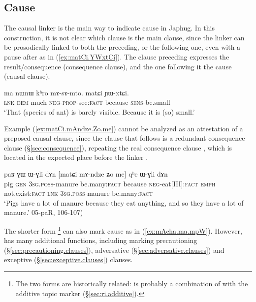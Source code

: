  \subsection{Cause} \label{sec:causal.clauses}
The causal linker  is the main way to indicate cause in Japhug. In this construction, it is not clear which clause is the main clause, since the linker can be prosodically linked to both the preceding, or the following one, even with a pause after  as in (\ref{ex:matCi.YWxtCi}). The clause preceding  expresses the result/consequence (consequence clause), and the one following it the cause (causal clause).


\begin{exe}
\ex \label{ex:matCi.YWxtCi}
\gll ma nɯnɯ kʰro mɤ-sɤ-mto. matɕi ɲɯ-xtɕi. \\
\textsc{lnk} \textsc{dem} much \textsc{neg}-\textsc{prop}-see:\textsc{fact} because \textsc{sens}-be.small \\
\glt `That (species of ant) is barely visible. Because it is (so) small.'
\end{exe} 

Example (\ref{ex:matCi.mAndze.Zo.me}) cannot be analyzed as an attestation of a preposed  causal clause, since the clause that follows  is a redundant consequence clause (§\ref{sec:consequence}), repeating the real consequence clause , which is located in the expected place before the linker .


\begin{exe}
\ex \label{ex:matCi.mAndze.Zo.me}
\gll paʁ ɣɯ ɯ-ɣli dɤn [matɕi mɤ-ndze ʑo me] qʰe ɯ-ɣli dɤn  \\
pig \textsc{gen} \textsc{3sg}.\textsc{poss}-manure be.many:\textsc{fact} because \textsc{neg}-eat[III]:\textsc{fact} \textsc{emph} not.exist:\textsc{fact} \textsc{lnk} \textsc{3sg}.\textsc{poss}-manure  be.many:\textsc{fact} \\
\glt `Pigs have a lot of manure because they eat anything, and so they have a lot of manure.' 05-paR, 106-107)
\end{exe}

The shorter form \footnote{The two forms are historically related:  is probably a combination of  with the additive topic marker  (§\ref{sec:ri.additive}). } can also mark cause as in (\ref{ex:mAcha.ma.mpW}). However,  has many additional functions, including marking precautioning (§\ref{sec:precautioning.clauses}), adversative (§\ref{sec:adversative.clauses}) and exceptive (§\ref{sec:exceptive.clauses}) clauses.

